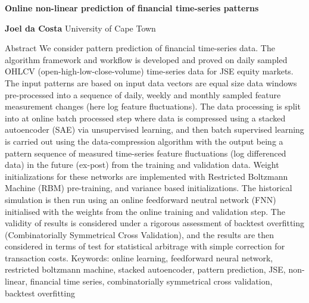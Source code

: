 \documentclass[a4paper,latin]{paper}
\begin{document}
\begin{titlepage}
	\begin{center}
		\vspace*{1cm}

		\Huge
		\textbf{Online non-linear prediction of financial time-series patterns}
		\vspace{0.5cm}
		\LARGE
		
		\vspace{1.5cm}
		
		\textbf{Joel da Costa}
		\vfill
		\vspace{0.8cm}
		\Large
		University of Cape Town\\
		
	\end{center}
\end{titlepage}
\newpage
\vspace{0.5cm}
\LARGE
Abstract
\normalsize
\newline\newline
We consider pattern prediction of financial time-series data. The algorithm framework and workflow is developed and proved on daily sampled OHLCV (open-high-low-close-volume) time-series data for JSE equity markets. The input patterns are based on input data vectors are equal size data windows pre-processed into a sequence of daily, weekly and monthly sampled feature measurement changes (here log feature fluctuations). The data processing is split into at online batch processed step where data is compressed using a stacked autoencoder (SAE) via unsupervised learning, and then batch supervised learning is carried out using the data-compression algorithm with the output being a pattern sequence of measured time-series feature fluctuations (log differenced data) in the future (ex-post) from the training and validation data. Weight initializations for these networks are implemented with Restricted Boltzmann Machine (RBM) pre-training, and variance based initializations. The historical simulation is then run using an online feedforward neutral network (FNN) initialised with the weights from the online training and validation step. The validity of results is considered under a rigorous assessment of backtest overfitting (Combinatorially Symmetrical Cross Validation), and the results are then considered in terms of test for statistical arbitrage with simple correction for transaction costs.
\newline\newline
Keywords: online learning, feedforward neural network, restricted boltzmann machine, stacked autoencoder, pattern prediction, JSE, non-linear, financial time series, combinatorially symmetrical cross validation, backtest overfitting
\newpage
\tableofcontents
\newpage
\end{document}
